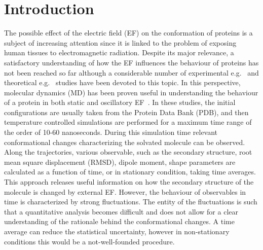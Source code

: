 \documentclass[a4paper,preprint,unsortedaddress,onecolumn]{revtex4-1}
\begin{document}
\maketitle


\section{Introduction}
The possible effect of the electric field (EF) on the conformation of
proteins is a subject of increasing attention since it is linked to the problem of exposing human tissues to
electromagnetic radiation. Despite its major relevance, a
satisfactory understanding of how the EF influences the behaviour of proteins
has not been reached so far although a considerable number of
experimental e.g.~\cite{bohr2000microwave, bohr2000microwave-1,
  dePomerai2000cell, inskip2001cellular, mancinelli2004non} and
theoretical e.g.~\cite{budi2005electric, budi2007effect,
  budi2008comparative, toschi2008effects, astrakas2011electric,
  astrakas2012structural, damm2012can, starzyk2013proteins,
  english2009nonequilibrium, solomentsev2012effects}
studies have been devoted to this topic.
In this perspective, molecular dynamics (MD) has been proven useful in
understanding the behaviour of a protein 
in both static and oscillatory EF~\cite{budi2005electric, budi2007effect, budi2008comparative,
  toschi2008effects, astrakas2011electric, astrakas2012structural,
  damm2012can, starzyk2013proteins, english2009nonequilibrium,
  solomentsev2012effects}. In these studies, the initial
configurations are usually taken from the Protein Data Bank (PDB),
and then temperature controlled simulations are performed for a maximum
time range of the order of 10-60 nanoseconds.
During this simulation time 
relevant conformational changes characterizing the solvated molecule can be observed. 
Along the trajectories, various observable, such as the
secondary structure, root mean square displacement (RMSD), dipole
moment, shape parameters are calculated as a function of time, or
in stationary condition, taking time averages.
This approach releases useful information on how the
secondary structure of the molecule is changed by external  EF.  However,
the behaviour of observables in time is characterized by 
strong
fluctuations. The entity of the fluctuations is such that a quantitative 
analysis becomes difficult and does not allow for  a clear understanding of the rationale behind the conformational changes.
A time average can reduce the statistical uncertainty,
however in non-stationary conditions this would be a not-well-founded procedure.
\end{document}
